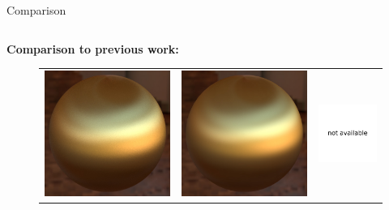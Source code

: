 \documentclass[final]{beamer}
\newlength{\onecolwid}
\newlength{\twocolwid}
\begin{document}
\begin{frame}[t]
\begin{columns}[t]
\begin{column}{\twocolwid}
\begin{block}{Comparison}
            \vspace{0.5cm}
            \begin{columns}[t,totalwidth=\twocolwid]
                \begin{column}{\onecolwid} 
                    \textbf{Comparison to previous work:}
                    \begin{figure}
                        \vspace{-1cm}
                    	\begin{tabular}{ccc}
                    	    \includegraphics[width=0.32\columnwidth]{images/validations/compare2/aniso_comb_hor_hor_512spp_17min.jpg} &
                    	    \includegraphics[width=0.32\columnwidth]{images/validations/compare2/aniso_comb_hor_hor_wenzel.jpg} &
                    	    \includegraphics[width=0.32\columnwidth]{images/validations/compare2/na.pdf} \\
                    

\end{tabular}
\end{figure}
\end{column}
\end{columns}
\end{block}
\end{column}
\end{columns}
\end{frame}
\end{document}
